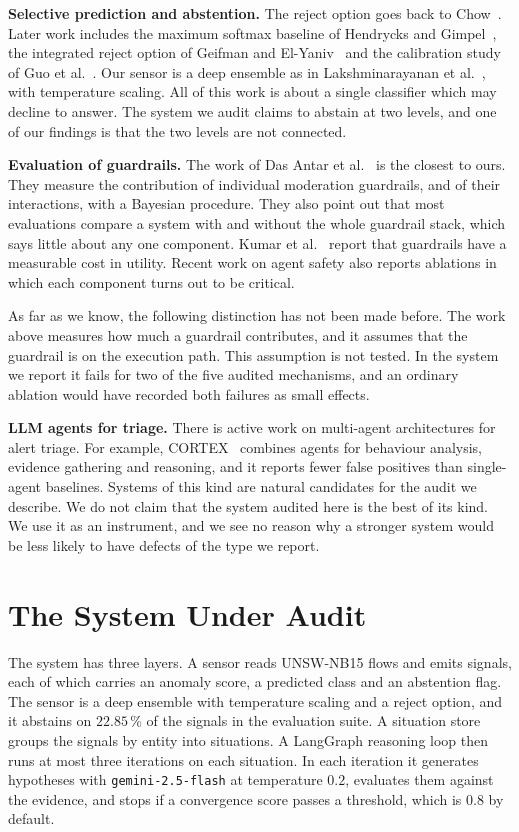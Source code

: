 \documentclass[conference]{IEEEtran}
\begin{document}
\textbf{Selective prediction and abstention.}
The reject option goes back to Chow~\cite{chow1970}. Later work includes the
maximum softmax baseline of Hendrycks and Gimpel~\cite{hendrycks2017}, the
integrated reject option of Geifman and El-Yaniv~\cite{geifman2019} and the
calibration study of Guo et al.~\cite{guo2017}. Our sensor is a deep ensemble
as in Lakshminarayanan et al.~\cite{lakshminarayanan2017}, with temperature
scaling. All of this work is about a single classifier which may decline to
answer. The system we audit claims to abstain at two levels, and one of our
findings is that the two levels are not connected.

\textbf{Evaluation of guardrails.}
The work of Das Antar et al.~\cite{dasantar2025} is the closest to ours. They
measure the contribution of individual moderation guardrails, and of their
interactions, with a Bayesian procedure. They also point out that most
evaluations compare a system with and without the whole guardrail stack, which
says little about any one component. Kumar et al.~\cite{nofreelunch2025} report
that guardrails have a measurable cost in utility. Recent work on agent safety
also reports ablations in which each component turns out to be critical.

As far as we know, the following distinction has not been made before. The
work above measures how much a guardrail contributes, and it assumes that the
guardrail is on the execution path. This assumption is not tested. In the
system we report it fails for two of the five audited mechanisms, and an
ordinary ablation would have recorded both failures as small effects.

\textbf{LLM agents for triage.}
There is active work on multi-agent architectures for alert triage. For
example, CORTEX~\cite{cortex2025} combines agents for behaviour analysis,
evidence gathering and reasoning, and it reports fewer false positives than
single-agent baselines. Systems of this kind are natural candidates for the
audit we describe. We do not claim that the system audited here is the best of
its kind. We use it as an instrument, and we see no reason why a stronger
system would be less likely to have defects of the type we report.

\section{The System Under Audit}

The system has three layers. A sensor reads UNSW-NB15 flows and emits signals,
each of which carries an anomaly score, a predicted class and an abstention
flag. The sensor is a deep ensemble with temperature scaling and a reject
option, and it abstains on $22.85$\,\% of the signals in the evaluation suite.
A situation store groups the signals by entity into situations. A LangGraph
reasoning loop then runs at most three iterations on each situation. In each
iteration it generates hypotheses with \texttt{gemini-2.5-flash} at temperature
$0.2$, evaluates them against the evidence, and stops if a convergence score
passes a threshold, which is $0.8$ by default.
\end{document}
